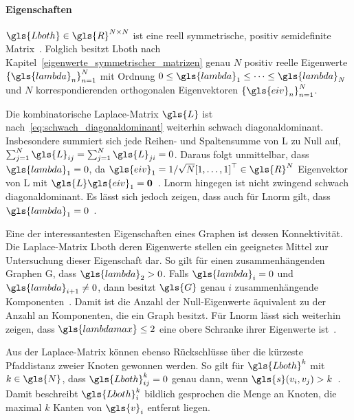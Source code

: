 \paragraph{Eigenschaften}
\label{laplace_eigenschaften}

$\gls{Lboth} \in \gls{R}^{N \times N}$ ist eine reell symmetrische, positiv semidefinite Matrix~\cite{Chung}.
Folglich besitzt \gls{Lboth} nach Kapitel~\ref{eigenwerte_symmetrischer_matrizen} genau $N$ positiv reelle Eigenwerte ${\left\{\gls{lambda}_n\right\}}_{n=1}^N$ mit Ordnung $0 \leq \gls{lambda}_1 \leq \cdots \leq \gls{lambda}_N$ und $N$ korrespondierenden orthogonalen Eigenvektoren ${\left\{\gls{eiv}_n\right\}}_{n=1}^N$.

Die kombinatorische Laplace-Matrix $\gls{L}$ ist nach~\eqref{eq:schwach_diagonaldominant} weiterhin schwach diagonaldominant.
Insbesondere summiert sich jede Reihen- und Spaltensumme von \gls{L} zu Null auf, \dhe{} $\sum_{j=1}^N \gls{L}_{ij} = \sum_{j=1}^N \gls{L}_{ji} = 0$.
Daraus folgt unmittelbar, dass $\gls{lambda}_1 = 0$, da $\gls{eiv}_1 = 1/\sqrt{N}{\left[1, \ldots, 1\right]}^{\top} \in \gls{R}^N$ Eigenvektor von \gls{L} mit $\gls{L}\gls{eiv}_1 = \ve{0}$~\cite{Shuman}.
\gls{Lnorm} hingegen ist nicht zwingend schwach diagonaldominant.
Es lässt sich jedoch zeigen, dass auch für \gls{Lnorm} gilt, dass $\gls{lambda}_1 = 0$~\cite{Chung}.

Eine der interessantesten Eigenschaften eines Graphen ist dessen Konnektivität.
Die Laplace-Matrix \gls{Lboth} \bzw{} deren Eigenwerte stellen ein geeignetes Mittel zur Untersuchung dieser Eigenschaft dar.
So gilt \bspw{} für einen zusammenhängenden Graphen \gls{G}, dass $\gls{lambda}_2 > 0$.
Falls $\gls{lambda}_i = 0$ und $\gls{lambda}_{i+1} \neq 0$, dann besitzt $\gls{G}$ genau $i$ zusammenhängende Komponenten~\cite{Chung}.
Damit ist die Anzahl der Null-Eigenwerte äquivalent zu der Anzahl an Komponenten, die ein Graph besitzt.
Für \gls{Lnorm} lässt sich weiterhin zeigen, dass $\gls{lambdamax} \leq 2$ eine obere Schranke ihrer Eigenwerte ist~\cite{Chung}.

Aus der Laplace-Matrix können ebenso Rückschlüsse über die kürzeste Pfaddistanz zweier Knoten gewonnen werden.
So gilt für $\gls{Lboth}^{k}$ mit $k \in \gls{N}$, dass $\gls{Lboth}^k_{ij} = 0$ genau dann, wenn $\gls{s}\left(v_i, v_j\right) > k$~\cite{Hammond}.
Damit beschreibt $\gls{Lboth}^k_i$ bildlich gesprochen die Menge an Knoten, die maximal $k$ Kanten von $\gls{v}_i$ entfernt liegen.
